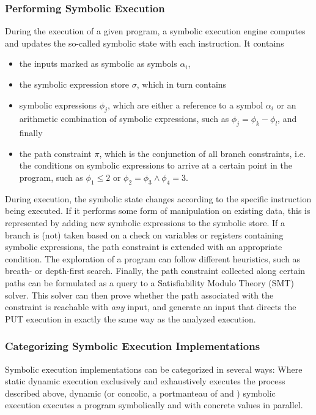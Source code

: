 \documentclass{article}
\begin{document}
\begin{multicols}{2}
    \subsubsection{Performing Symbolic Execution}
    During the execution of a given program, a symbolic execution engine computes and updates the so-called symbolic state with each instruction. It contains
    \begin{itemize}
        \item the inputs marked as symbolic as symbols $\alpha_i$,
        \item the symbolic expression store $\sigma$, which in turn contains
        \item symbolic expressions $\phi_j$, which are either a reference to a symbol $\alpha_i$ or an arithmetic combination of symbolic expressions, such as $\phi_j=\phi_k-\phi_l$, and finally
        \item the path constraint $\pi$, which is the conjunction of all branch constraints, i.e. the conditions on symbolic expressions to arrive at a certain point in the program, such as $\phi_1\leq2$ or $\phi_2=\phi_3\land\phi_4=3$.
    \end{itemize}

    During execution, the symbolic state changes according to the specific instruction being executed. If it performs some form of manipulation on existing data, this is represented by adding new symbolic expressions to the symbolic store. If a branch is (not) taken based on a check on variables or registers containing symbolic expressions, the path constraint is extended with an appropriate condition. The exploration of a program can follow different heuristics, such as breath- or depth-first search. Finally, the path constraint collected along certain paths can be formulated as a query to a Satisfiability Modulo Theory (SMT) solver. This solver can then prove whether the path associated with the constraint is reachable with \textit{any} input, and generate an input that directs the PUT execution in exactly the same way as the analyzed execution.

    \subsubsection{Categorizing Symbolic Execution Implementations}
    Symbolic execution implementations can be categorized in several ways: Where static dynamic execution exclusively and exhaustively executes the process described above, dynamic (or concolic, a portmanteau of  and ) symbolic execution executes a program symbolically and with concrete values in parallel.


\end{multicols}
\end{document}
